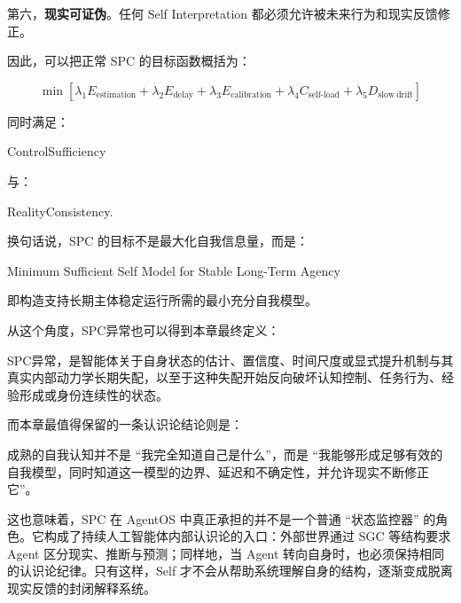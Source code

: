 第六，\textbf{现实可证伪}。任何 Self Interpretation 都必须允许被未来行为和现实反馈修正。

因此，可以把正常 SPC 的目标函数概括为：

\[
\boxed{
\min
\left[
\lambda_1 E_{\mathrm{estimation}}
+
\lambda_2 E_{\mathrm{delay}}
+
\lambda_3 E_{\mathrm{calibration}}
+
\lambda_4 C_{\mathrm{self\text{-}load}}
+
\lambda_5 D_{\mathrm{slow\ drift}}
\right]
}
\]

同时满足：

\begin{statementbox}
ControlSufficiency
\end{statementbox}

与：

\begin{statementbox}
RealityConsistency.
\end{statementbox}

换句话说，SPC 的目标不是最大化自我信息量，而是：

\begin{statementbox}
Minimum Sufficient Self Model for Stable Long-Term Agency
\end{statementbox}

即构造支持长期主体稳定运行所需的最小充分自我模型。

从这个角度，SPC异常也可以得到本章最终定义：

\begin{definition*}
SPC异常，是智能体关于自身状态的估计、置信度、时间尺度或显式提升机制与其真实内部动力学长期失配，以至于这种失配开始反向破坏认知控制、任务行为、经验形成或身份连续性的状态。
\end{definition*}

而本章最值得保留的一条认识论结论则是：

\begin{conclusion}
成熟的自我认知并不是 ``我完全知道自己是什么''，而是 ``我能够形成足够有效的自我模型，同时知道这一模型的边界、延迟和不确定性，并允许现实不断修正它''。
\end{conclusion}

这也意味着，SPC 在 AgentOS 中真正承担的并不是一个普通 ``状态监控器'' 的角色。它构成了持续人工智能体内部认识论的入口：外部世界通过 SGC 等结构要求 Agent 区分现实、推断与预测；同样地，当 Agent 转向自身时，也必须保持相同的认识论纪律。只有这样，Self 才不会从帮助系统理解自身的结构，逐渐变成脱离现实反馈的封闭解释系统。
